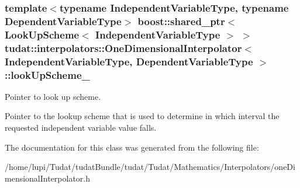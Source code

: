 \subsubsection[{\texorpdfstring{look\+Up\+Scheme\+\_\+}{lookUpScheme_}}]{\setlength{\rightskip}{0pt plus 5cm}template$<$typename Independent\+Variable\+Type, typename Dependent\+Variable\+Type$>$ boost\+::shared\+\_\+ptr$<$ {\bf Look\+Up\+Scheme}$<$ Independent\+Variable\+Type $>$ $>$ {\bf tudat\+::interpolators\+::\+One\+Dimensional\+Interpolator}$<$ Independent\+Variable\+Type, Dependent\+Variable\+Type $>$\+::look\+Up\+Scheme\+\_\+\hspace{0.3cm}{\ttfamily [protected]}}\hypertarget{classtudat_1_1interpolators_1_1OneDimensionalInterpolator_a2a10fe6e43ac42100e4f650ab83798f5}{}\label{classtudat_1_1interpolators_1_1OneDimensionalInterpolator_a2a10fe6e43ac42100e4f650ab83798f5}


Pointer to look up scheme. 

Pointer to the lookup scheme that is used to determine in which interval the requested independent variable value falls. 

The documentation for this class was generated from the following file\+:\begin{DoxyCompactItemize}
\item 
/home/lupi/\+Tudat/tudat\+Bundle/tudat/\+Tudat/\+Mathematics/\+Interpolators/one\+Dimensional\+Interpolator.\+h\end{DoxyCompactItemize}
